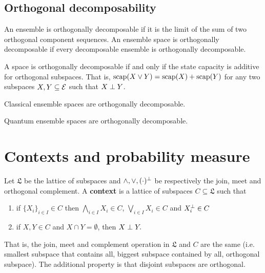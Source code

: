 \subsection{Orthogonal decomposability}

\begin{defn}
	An ensemble is orthogonally decomposable if it is the limit of the sum of two orthogonal component sequences. An ensemble space is orthogonally decomposable if every decomposable ensemble is orthogonally decomposable.
\end{defn}

\begin{conj}
	A space is orthogonally decomposable if and only if the state capacity is additive for orthogonal subspaces. That is, $\mathrm{scap}(X \vee Y) = \mathrm{scap}(X) + \mathrm{scap}(Y)$ for any two subspaces $X, Y \subseteq \mathcal{E}$ such that $X \perp Y$.
\end{conj}

\begin{conj}
	Classical ensemble spaces are orthogonally decomposable.
\end{conj}

\begin{conj}
	Quantum ensemble spaces are orthogonally decomposable.
\end{conj}

\section{Contexts and probability measure}

\begin{defn}
	Let $\mathfrak{L}$ be the lattice of subspaces and $\wedge, \vee, (\cdot)^\perp$ be respectively the join, meet and orthogonal complement. A \textbf{context} is a lattice of subspaces $C \subseteq \mathfrak{L}$ such that
	\begin{enumerate}
		\item if $\{X_i\}_{i \in I} \in C$ then $\bigwedge_{i \in I} X_i \in C$, $\bigvee_{i \in I} X_i \in C$ and $X_i^\perp \in C$
		\item if $X, Y \in C$ and $X \cap Y = \emptyset$, then $X \perp Y.$
	\end{enumerate}
	That is, the join, meet and complement operation in $\mathfrak{L}$ and $C$ are the same (i.e. smallest subspace that contains all, biggest subspace contained by all, orthogonal subspace). The additional property is that disjoint subspaces are orthogonal.
\end{defn}

